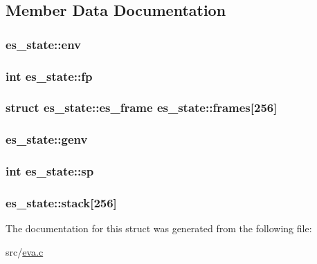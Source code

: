 \subsection{Member Data Documentation}
\hypertarget{structes__state_ae0839c4e0ee8dffc922fae02c8d74ea4}{
\subsubsection[{env}]{ es\-\_\-state\-::env}}\label{structes__state_ae0839c4e0ee8dffc922fae02c8d74ea4}
\hypertarget{structes__state_a4be41ad3ddfeba5e608402cee42a226d}{
\subsubsection[{fp}]{\setlength{\rightskip}{0pt plus 5cm}int es\-\_\-state\-::fp}}\label{structes__state_a4be41ad3ddfeba5e608402cee42a226d}
\hypertarget{structes__state_a06c81d99b80e9f932018590b6c98b7a8}{
\subsubsection[{frames}]{\setlength{\rightskip}{0pt plus 5cm}struct {\bf es\-\_\-state\-::es\-\_\-frame}  es\-\_\-state\-::frames\mbox{[}256\mbox{]}}}\label{structes__state_a06c81d99b80e9f932018590b6c98b7a8}
\hypertarget{structes__state_a6e1f2edd068f8bd2635f7ef93550efce}{
\subsubsection[{genv}]{ es\-\_\-state\-::genv}}\label{structes__state_a6e1f2edd068f8bd2635f7ef93550efce}
\hypertarget{structes__state_a1b5c740c6ef0c58344525646f9eb9d5a}{
\subsubsection[{sp}]{\setlength{\rightskip}{0pt plus 5cm}int es\-\_\-state\-::sp}}\label{structes__state_a1b5c740c6ef0c58344525646f9eb9d5a}
\hypertarget{structes__state_a4c92ffb8915396ec7f829975a5658a08}{
\subsubsection[{stack}]{ es\-\_\-state\-::stack\mbox{[}256\mbox{]}}}\label{structes__state_a4c92ffb8915396ec7f829975a5658a08}


The documentation for this struct was generated from the following file\-:\begin{DoxyCompactItemize}
\item 
src/\hyperlink{eva_8c}{eva.\-c}\end{DoxyCompactItemize}
